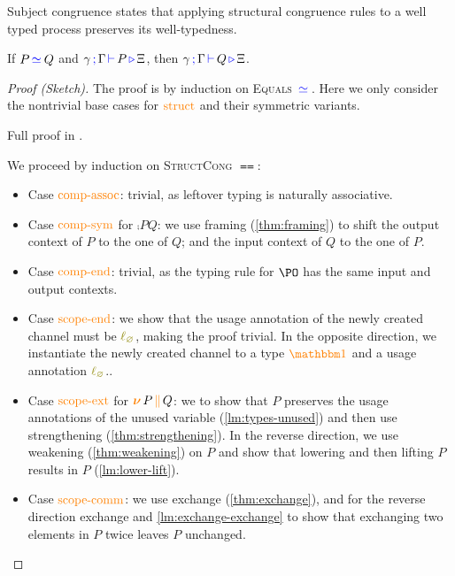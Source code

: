 Subject congruence states that applying structural congruence rules to a well typed process preserves its well-typedness.
\begin{nitheorem}
  \label{thm:subject-congruence1}
  If $P \, \textcolor{blue}{\operatorname{\simeq}}_{} \, Q$ and $\gamma \, \textcolor{blue}{\operatorname{;}} \, \Gamma \, \textcolor{blue}{\operatorname{\vdash}} \, P \, \textcolor{blue}{\operatorname{\triangleright}} \, \Xi$, then $\gamma \, \textcolor{blue}{\operatorname{;}} \, \Gamma \, \textcolor{blue}{\operatorname{\vdash}} \, Q \, \textcolor{blue}{\operatorname{\triangleright}} \, \Xi$.
\end{nitheorem}

\begin{proof}[Proof (Sketch)]
  The proof is by induction on \textsc{Equals} $\, \textcolor{blue}{\operatorname{\simeq}}_{} \,$.
  Here we only consider the nontrivial base cases for $\textcolor{orange}{\operatorname{struct}}$ and their symmetric variants.
\begin{anonsuppress}
Full proof in \cite{Zalakain2020Agda}.
\end{anonsuppress}
  We proceed by induction on \textsc{StructCong} $\eqeq$:
  \begin{itemize}
    \item
      Case $\textcolor{orange}{\operatorname{comp-assoc}}$: trivial, as leftover typing is naturally associative.
    \item
      Case $\textcolor{orange}{\operatorname{comp-sym}}$ for $\comp{P}{Q}$: we use framing (\autoref{thm:framing}) to shift the output context of $P$ to the one of $Q$; and the input context of $Q$ to the one of $P$.
    \item
      Case $\textcolor{orange}{\operatorname{comp-end}}$: trivial, as the typing rule for $\PO$ has the same input and output contexts.
    \item
      Case $\textcolor{orange}{\operatorname{scope-end}}$: we show that the usage annotation of the newly created channel must be $\lz$, making the proof trivial.
      In the opposite direction, we instantiate the newly created channel to a type $\unit$ and a usage annotation $\lz$..
    \item
      Case $\textcolor{orange}{\operatorname{scope-ext}}$ for $\textcolor{orange}{\operatorname{\boldsymbol{\nu}}} \, P \, \textcolor{orange}{\operatorname{\parallel}} \, Q$: we to show that $P$ preserves the usage annotations of the unused variable (\autoref{lm:types-unused}) and then use strengthening (\autoref{thm:strengthening}).
      In the reverse direction, we use weakening (\autoref{thm:weakening}) on $P$ and show that lowering and then lifting $P$ results in $P$ (\autoref{lm:lower-lift}).
    \item
      Case $\textcolor{orange}{\operatorname{scope-comm}}$:
      we use exchange (\autoref{thm:exchange}), and for the reverse direction exchange and \autoref{lm:exchange-exchange} to show that exchanging two elements in $P$ twice leaves $P$ unchanged. \qedhere
  \end{itemize}
\end{proof}

